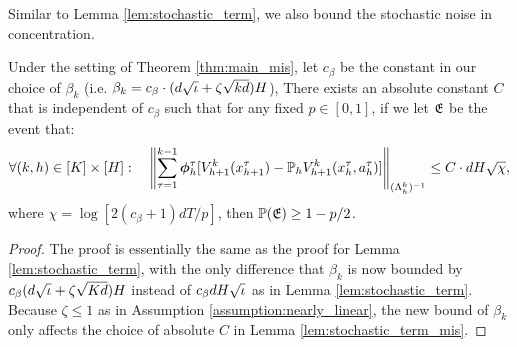 Similar to Lemma \ref{lem:stochastic_term}, we also bound the stochastic noise in concentration.
\begin{lemma} \label{lem:stochastic_term_mis}
Under the setting of Theorem \ref{thm:main_mis}, let $c_{\beta}$ be the constant in our choice of $\beta_k$ (i.e. $\beta_k = c_\beta \cdot (d\sqrt{\iota}+\zeta \sqrt{kd})H$),
There exists an absolute constant $C$ that is independent of $c_{\beta}$ such that for any fixed $p\in[0, 1]$, if we let $\mathfrak{E}$ be the event that:
\begin{equation*}
\forall (k, h)\in [K]\times [H]: \quad \left\|{\sum_{\tau = 1}^{k-1} \bm{\phi}^\tau_h [V^{k}_{h+1}(x^\tau_{h+1}) - \mathbb{P}_h V^{k}_{h+1}(x_h^\tau, a_h^\tau)]}\right\|_{(\Lambda^k_h)^{-1}}
\le C\cdot dH\sqrt{\chi}, 
\end{equation*}
where $\chi = \log [2(c_\beta+1)dT/p]$, then $\mathbb{P}(\mathfrak{E}) \ge 1-p/2$.
\end{lemma}
\begin{proof}
The proof is essentially the same as the proof for Lemma \ref{lem:stochastic_term}, with the only difference that $\beta_k$ is now bounded by $c_\beta (d\sqrt{\iota} +\zeta\sqrt{Kd})H$ instead of $c_\beta dH\sqrt{\iota}$ as in Lemma \ref{lem:stochastic_term}. Because $\zeta \le 1$ as in Assumption \ref{assumption:nearly_linear}, the new bound of $\beta_k$ only affects the choice of absolute $C$ in Lemma \ref{lem:stochastic_term_mis}. 
\end{proof}






